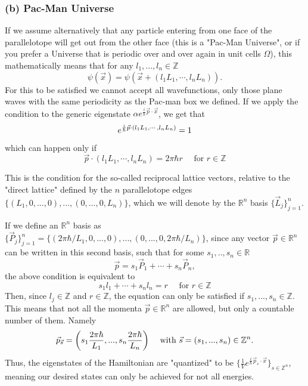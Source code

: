 \documentclass[11pt, a4paper]{article} %
\newcommand{\R}{\mathbb{R}} %
\newcommand{\Z}{\mathbb{Z}} %
\DeclareRobustCommand{\mybox}[2][gray!10]{%
\begin{tcolorbox}[   %
        left=0.2cm,
        right=0.2cm,
        top=0.15cm,
        bottom=0.15cm,
        colback=#1,
        colframe=#1,
        width=\dimexpr\textwidth\relax, 
        enlarge left by=0mm,
        boxsep=5pt,
        arc=0pt,outer arc=0pt,
        ]
        #2
\end{tcolorbox}
}
\begin{document}
\subsubsection*{(b) Pac-Man Universe}
If we assume alternatively that any particle entering from one face of the parallelotope will get out from the other face (this is a "Pac-Man Universe", or if you prefer a Universe that is periodic over and over again in unit cells $\Omega$), this mathematically means that for any $l_1,...,l_n\in\Z$
\begin{equation}
\psi(\vec{x})=\psi(\vec{x}+(l_1L_1,\cdots , l_nL_n)).
\end{equation}
For this to be satisfied we cannot accept all wavefunctions, only those plane waves with the same periodicity as the Pac-man box we defined. If we apply the condition to the generic eigenstate $\alpha e^{\frac{i}{\hbar}\vec{p}\cdot \vec{x}}$, we get that
\begin{equation}
e^{\frac{i}{\hbar}\vec{p}\cdot\qty({l_1L_1,\cdots ,l_nL_n})}=1
\end{equation}
which can happen only if
\begin{equation}
\vec{p}\cdot( l_1L_1,\cdots, l_nL_n)=2\pi \hbar r \quad \text{ for } r\in\Z 
\end{equation}
\mybox{
This is the condition for the so-called reciprocal lattice vectors, relative to the "direct lattice" defined by the $n$ parallelotope edges $\{(L_1,0,...,0), ..., (0,...,0,L_n)\}$, which we will denote by the $\R^n$ basis $\{\vec{L}_j\}_{j=1}^n$.
}

If we define an $\R^n$ basis as $\{\vec{P}_j\}_{j=1}^n=\{(2\pi\hbar/L_1,0,...,0), ..., (0,...,0,2\pi\hbar/L_n)\}$, since any vector $\vec{p}\in\R^n$ can be written in this second basis, such that for some $s_1,..,s_n\in\R$
\begin{equation}
\vec{p}=s_1\vec{P}_1+\cdots+s_n\vec{P}_n,
\end{equation}
the above condition is equivalent to
\begin{equation}
s_1l_1+\cdots+s_nl_n= r \quad \text{ for }r\in\Z
\end{equation}
Then, since $l_j\in\Z$ and $r\in\Z$, the equation can only be satisfied if $s_1,...,s_n\in\Z$. This means that not all the momenta $\vec{p}\in\R^n$ are allowed, but only a countable number of them. Namely
\begin{equation}
\vec{p}_{\vec{s}}=\qty(s_1\frac{2\pi\hbar}{L_1},...,s_n\frac{2\pi\hbar}{L_n})\quad \text{ with } \vec{s}=(s_1,...,s_n)\in\Z^n.
\end{equation}
Thus, the eigenstates of the Hamiltonian are "quantized" to be $\{\frac{1}{V} e^{\frac{i}{\hbar}\vec{p}_{s}\cdot \vec{x}}\}_{s\in\Z^n}$, meaning our desired states can only be achieved for not all energies.
\end{document}
